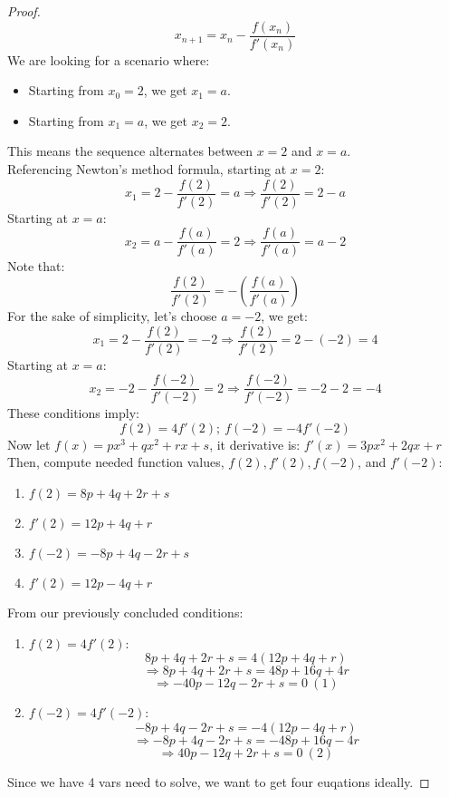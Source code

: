 \documentclass{article}
\begin{document}
\begin{proof}
    \[ x_{n + 1} = x_n - \frac{f(x_n)}{f'(x_n)} \]
    We are looking for a scenario where:
    \begin{itemize}
        \item Starting from $x_0 = 2$, we get $x_1 = a$.
        \item Starting from $x_1 = a$, we get $x_2 = 2$.
    \end{itemize}
    This means the sequence alternates between $x = 2$ and $x = a$.
    \\
    Referencing Newton's method formula, starting at $x = 2$:
    \[ x_1 = 2 - \frac{f(2)}{f'(2)} = a \Rightarrow \frac{f(2)}{f'(2)} = 2 - a \]
    Starting at $x = a$:
    \[ x_2 = a - \frac{f(a)}{f'(a)} = 2 \Rightarrow \frac{f(a)}{f'(a)} = a - 2 \]
    Note that:
    \[ \frac{f(2)}{f'(2)} = - \left( \frac{f(a)}{f'(a)} \right) \]
    For the sake of simplicity, let's choose $a = -2$, we get:
    \[ x_1 = 2 - \frac{f(2)}{f'(2)} = -2 \Rightarrow \frac{f(2)}{f'(2)} = 2 - (-2) = 4 \]
    Starting at $x = a$:
    \[ x_2 = -2 - \frac{f(-2)}{f'(-2)} = 2 \Rightarrow \frac{f(-2)}{f'(-2)} = -2 - 2 = -4 \]
    These conditions imply:
    \[ f(2) = 4f'(2); \  f(-2) = -4f'(-2) \]
    Now let $f(x) = px^3 + qx^2 + rx + s$, it derivative is: $f'(x) = 3px^2 + 2qx + r$
    \\
    Then, compute needed function values, $f(2), f'(2), f(-2)$, and $f'(-2)$:
    \begin{enumerate}
        \item $f(2) = 8p + 4q + 2r + s$
        \item $f'(2) = 12p + 4q + r$
        \item $f(-2) = -8p + 4q - 2r + s$
        \item $f'(2) = 12p - 4q + r$
    \end{enumerate}
    From our previously concluded conditions:
    \begin{enumerate}
        \item $f(2) = 4f'(2)$:
        \[ 8p + 4q + 2r + s = 4(12p + 4q + r) \]
        \[ \Rightarrow 8p + 4q + 2r + s = 48p + 16q + 4r \]
        \[ \Rightarrow -40p - 12q - 2r + s = 0 \ (1) \]
        \item $f(-2) = 4f'(-2)$:
        \[ -8p + 4q - 2r + s = -4(12p - 4q + r) \]
        \[ \Rightarrow -8p + 4q - 2r + s = -48p + 16q - 4r \]
        \[ \Rightarrow 40p - 12q + 2r + s = 0 \ (2) \]
    \end{enumerate}
    Since we have 4 vars need to solve, we want to get four euqations ideally. 

\end{proof}
\end{document}
